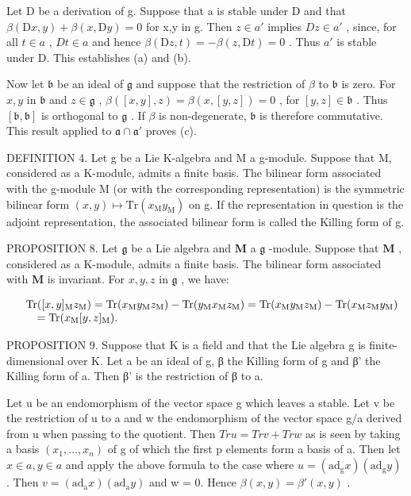Let D be a derivation of g. Suppose that a is stable under D and that \(\beta(\mathrm{D}x,y)+\beta(x,\mathrm{D}y)=0\) for x,y in g. Then \(z\in a'\) implies \(Dz\in a'\) , since, for all \(t\in a\) , \(Dt\in a\) and hence \(\beta(\mathrm{D}z,t)=-\beta(z,\mathrm{D}t)=0\) . Thus \(a'\) is stable under D. This establishes (a) and (b).

Now let \(\mathfrak{b}\) be an ideal of \(\mathfrak{g}\) and suppose that the restriction of \(\beta\) to \(\mathfrak{b}\) is zero. For \(x, y\) in \(\mathfrak{b}\) and \(z \in \mathfrak{g}\) , \(\beta ([ x, y ], z) = \beta(x, [y, z]) = 0\) , for \([y, z] \in \mathfrak{b}\) . Thus \([\mathfrak{b}, \mathfrak{b}]\) is orthogonal to \(\mathfrak{g}\) . If \(\beta\) is non-degenerate, \(\mathfrak{b}\) is therefore commutative. This result applied to \(\mathfrak{a} \cap \mathfrak{a}'\) proves (c).

DEFINITION 4. Let g be a Lie K-algebra and M a g-module. Suppose that M, considered as a K-module, admits a finite basis. The bilinear form associated with the g-module M (or with the corresponding representation) is the symmetric bilinear form \((x,y)\mapsto\mathrm{Tr}(x_{\mathrm{M}} y_{\mathrm{M}})\) on g. If the representation in question is the adjoint representation, the associated bilinear form is called the Killing form of g.

PROPOSITION 8. Let \(\mathfrak{g}\) be a Lie algebra and \(\mathbf{M}\) a \(\mathfrak{g}\) -module. Suppose that \(\mathbf{M}\) , considered as a K-module, admits a finite basis. The bilinear form associated with \(\mathbf{M}\) is invariant. For \(x, y, z\) in \(\mathfrak{g}\) , we have:

\[
\begin{array}{r l} & {\mathrm{Tr} ([ x, y ] _ {\mathrm{M}} z _ {\mathrm{M}}) = \mathrm{Tr} (x _ {\mathrm{M}} y _ {\mathrm{M}} z _ {\mathrm{M}}) - \mathrm{Tr} (y _ {\mathrm{M}} x _ {\mathrm{M}} z _ {\mathrm{M}}) = \mathrm{Tr} (x _ {\mathrm{M}} y _ {\mathrm{M}} z _ {\mathrm{M}}) - \mathrm{Tr} (x _ {\mathrm{M}} z _ {\mathrm{M}} y _ {\mathrm{M}})} \\ & {\quad = \mathrm{Tr} (x _ {\mathrm{M}} [ y, z ] _ {\mathrm{M}}).} \end{array}
\]

PROPOSITION 9. Suppose that K is a field and that the Lie algebra g is finite-dimensional over K. Let a be an ideal of g, β the Killing form of g and β' the Killing form of a. Then β' is the restriction of β to a.

Let u be an endomorphism of the vector space g which leaves a stable. Let v be the restriction of u to a and w the endomorphism of the vector space g/a derived from u when passing to the quotient. Then \(Tr u = Tr v + Tr w\) as is seen by taking a basis \((x_{1}, \ldots, x_{n})\) of g of which the first p elements form a basis of a. Then let \(x \in a, y \in a\) and apply the above formula to the case where \(u = (\mathrm{ad}_{\mathrm{g}} x)(\mathrm{ad}_{\mathrm{g}} y)\) . Then \(v = (\mathrm{ad}_{\mathrm{a}} x)(\mathrm{ad}_{\mathrm{a}} y)\) and w = 0. Hence \(\beta(x, y) = \beta'(x, y)\) .

